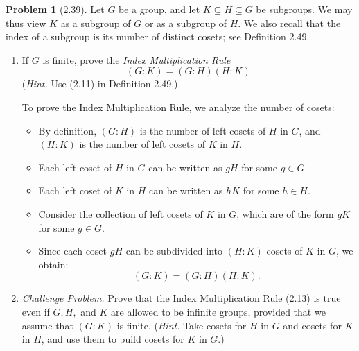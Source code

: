 \documentclass[12pt]{article}
\theoremstyle{definition}
\newtheorem{problem}{Problem}
\begin{document}
\begin{problem}[2.39]
    Let $G$ be a group, and let $K \subseteq H \subseteq G$ be subgroups. We may thus view $K$ as a subgroup of $G$ or as a subgroup of $H$.
    We also recall that the index of a subgroup is its number of distinct cosets; see Definition 2.49.
    \begin{enumerate}[label=(\alph*)]
        \item If $G$ is finite, prove the \textit{Index Multiplication Rule}
        \[(G:K) = (G:H)(H:K)\]
        (\textit{Hint.} Use (2.11) in Definition 2.49.)

        \begin{solution}
            To prove the Index Multiplication Rule, we analyze the number of cosets:
            \begin{itemize}
                \item By definition, $(G:H)$ is the number of left cosets of $H$ in $G$, and $(H:K)$ is the number of left cosets of $K$ in $H$.
                \item Each left coset of $H$ in $G$ can be written as $gH$ for some $g \in G$.
                \item Each left coset of $K$ in $H$ can be written as $hK$ for some $h \in H$.
                \item Consider the collection of left cosets of $K$ in $G$, which are of the form $gK$ for some $g \in G$.
                \item Since each coset $gH$ can be subdivided into $(H:K)$ cosets of $K$ in $G$, we obtain:
                \[
                (G:K) = (G:H)(H:K).
                \]
            \end{itemize}
        
        \end{solution}
        \item \textit{Challenge Problem.} Prove that the Index Multiplication Rule (2.13) is true even if $G, H,$ and $K$ are allowed to be infinite groups,
              provided that we assume that $(G : K)$ is finite. (\textit{Hint.} Take cosets for $H$ in $G$ and cosets for $K$ in $H$, and use them to build cosets for $K$ in $G$.)


\end{enumerate}
\end{problem}
\end{document}
